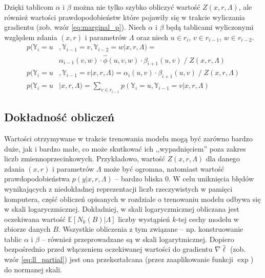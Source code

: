\documentclass[a4paper,10]{article}
\begin{document}
Dzięki tablicom $\alpha$ i $\beta$ można nie tylko szybko obliczyć wartość
$Z(x, r, \Lambda)$, ale również wartości prawdopodobieństw które pojawiły
się w trakcie wyliczania gradientu (zob. wzór \ref{eq:marginal_p}).
Niech $\alpha$ i $\beta$ będą tablicami wyliczonymi względem zdania
$(x, r)$ i parametrów $\Lambda$ oraz niech
$u \in r_i$, $v \in r_{i-1}$, $w \in r_{i-2}$.
\begin{align}
p(\mathbb Y_i = u&, \mathbb Y_{i-1} = v,
  \mathbb Y_{i-2} = w \vert x, r, \Lambda) = \label{eq:marginal_p3} \\
  &\alpha_{i-1}(v, w) \cdot \hat\phi(u, v, w) \cdot \beta_{i+1}(u, v)
  \; / \; Z(x, r, \Lambda) \nonumber \\
p(\mathbb Y_i = u&, \mathbb Y_{i-1} = v \vert x, r, \Lambda) = \label{eq:marginal_p2}
  \alpha_i(u, v) \cdot \beta_{i+1}(u, v)
  \; / \; Z(x, r, \Lambda) \\
p(\mathbb Y_i = u &\vert x, r, \Lambda) = \label{eq:marginal_p1}
  \sum_{v \in r_{i-1}} p(\mathbb Y_i = u, \mathbb Y_{i-1} = v \vert x, r, \Lambda)
\end{align}

\subsection{Dokładność obliczeń}

Wartości otrzymywane w trakcie trenowania modelu mogą być zarówno
bardzo duże, jak i bardzo małe, co może skutkować ich ,,wypadnięciem''
poza zakres liczb zmiennoprzecinkowych. Przykładowo, wartość $Z(x, r, \Lambda)$
dla danego zdania $(x, r)$ i parametrów $\Lambda$ może być ogromna, natomiast
wartość prawdopodobieństwa $p(y \vert x, r, \Lambda)$ -- bardzo bliska $0$.
W celu uniknięcia błędów wynikających z niedokładnej reprezentacji
liczb rzeczywistych w pamięci komputera, część obliczeń opisanych w
rozdziale o trenowaniu modelu odbywa się w skali logaryczmicznej.
Dokładniej, w skali logaryczmicznej obliczana jest oczekiwana wartość
$\mathbb E \left[ N_k(B) \vert \Lambda \right]$ liczby wystąpień $k$-tej
cechy modelu w zbiorze danych $B$. Wszystkie obliczenia z tym związane
-- np. konstruowanie tablic $\alpha$ i $\beta$ -- również przeprowadzane
są w skali logarytmicznej. Dopiero bezpośrednio przed włączeniem oczekiwanej
wartości do gradientu $\nabla\hat\ell$ (zob. wzór \ref{eq:ll_partial})
jest ona przekształcana (przez zaaplikowanie funkcji $\exp$) do normanej skali.

\end{document}
